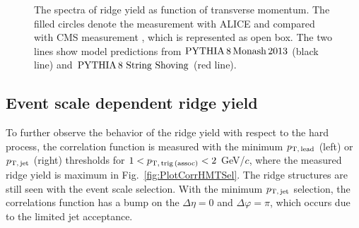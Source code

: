 \begin{figure}[h!]
	\centering
	\caption{ The spectra of ridge yield as function of transverse momentum. The filled circles denote the measurement with ALICE and compared with CMS measurement \cite{ridge_pp_1}, which is represented as open box. The two lines show model predictions from $\mathrm{PYTHIA}\,8\,\mathrm{Monash}\,2013$ (black line) and $\mathrm{PYTHIA}\,8~\mathrm{String}~\mathrm{Shoving}$ (red line). }
	\label{fig:PlotYSpect}
\end{figure}

\subsection{Event scale dependent ridge yield}

To further observe the behavior of the ridge yield with respect to the hard process, the correlation function is measured with the minimum $p_\mathrm{T,\,lead}$ (left) or $p_\mathrm{T,\,jet}$ (right) thresholds for $1<p_\mathrm{T,\,trig\,(assoc)}<2$ GeV/$c$, where the measured ridge yield is maximum in Fig.~\ref{fig:PlotCorrHMTSel}. The ridge structures are still seen with the event scale selection. With the minimum $p_\mathrm{T,\,jet}$ selection, the correlations function has a bump on the $\Delta\eta = 0$ and $\Delta\varphi = \pi$, which occurs due to the limited jet acceptance.

